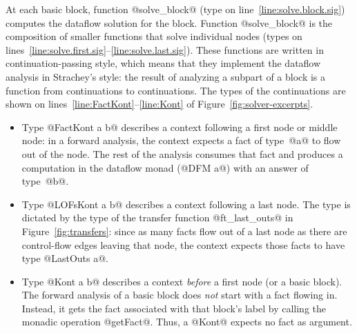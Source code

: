 \documentclass[blockstyle,preprint,natbib,nocopyrightspace]{sigplanconf}
\newcommand\lineref[1]{line~\ref{line:#1}}
\newcommand\linerangeref[2]{\mbox{lines~\ref{line:#1}--\ref{line:#2}}}
\newcommand\delendum[1]{\relax\ifvmode\else\unskip\fi\relax}
\newcommand\figref[1]{Figure~\ref{fig:#1}}
\begin{document}
At each basic block, function @solve_block@ (type on \lineref{solve.block.sig})
computes the dataflow solution for the block.
Function @solve_block@ is the composition of
smaller functions that solve individual nodes
(types on \linerangeref{solve.first.sig}{solve.last.sig}).
These functions are written in continuation-passing style,
which means that they implement the dataflow analysis in Strachey's style:
the result of analyzing a subpart of a block is a function from
continuations to continuations. 
The types of the
continuations are shown on \linerangeref{FactKont}{Kont} of
\figref{solver-excerpts}. 
\begin{itemize}
\item
Type @FactKont a b@ describes a context following a first node or middle
node: in a forward analysis, the context expects a fact of type~@a@
to flow out of the node.
The rest of the analysis consumes that
fact and produces a computation in the
dataflow monad (@DFM a@) with an answer of type~@b@.
\item
Type @LOFsKont a b@ describes a context following a last node.
The type is dictated by the type of the transfer function
@ft_last_outs@ in \figref{transfers}:
since as many facts flow out of a last node as there are control-flow
edges leaving that node, the context expects those facts to have type
@LastOuts a@.
\item
Type @Kont a b@ describes a context \emph{before} a first node (or a
basic block).
The forward analysis of a basic block does \emph{not} start with a
fact flowing in.
Instead, it gets the fact associated with that block's label by calling
the monadic operation @getFact@.
Thus, a @Kont@ expects no fact as argument.
\end{itemize}
\delendum{I like these continuations, but I'm very puzzled about the
fuel.  If @Kont@ takes fuel in, where does it return the depleted fuel?
It must come out eventualy, because it's needed in the rest of the program.
And if it always comes out, then we should say so:
@Kont a b = DFM a b@.
And once you do that, it's plain that @Kont@ is just a state monad,
and I can't see why it isn't part of @DFM@ in the first place.}
\end{document}

